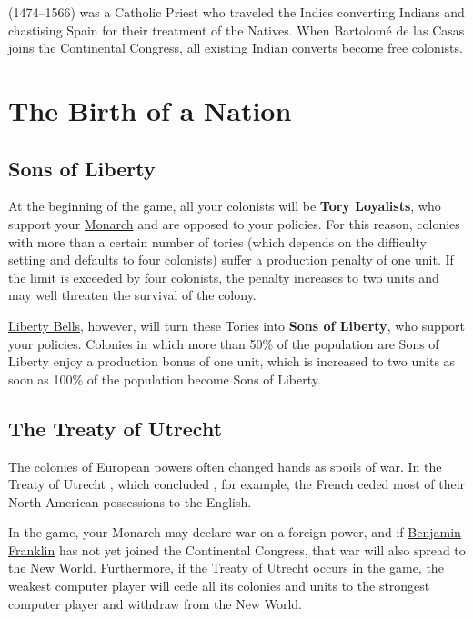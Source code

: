 \documentclass[12pt]{book}
\begin{document}
(1474--1566) was a Catholic Priest who traveled the Indies converting
Indians and chastising Spain for their treatment of the Natives. When
Bartolom\'e de las Casas joins the Continental Congress, all existing
Indian converts become free
colonists. 



\hypertarget{The Birth of a Nation}{\chapter{The Birth of a Nation}}

\hypertarget{Sons of Liberty}{\section{Sons of Liberty}}

At the beginning of the game, all your colonists will be
\hypertarget{Tories}{\textbf{Tory Loyalists}}, who support your
\hyperlink{Monarch}{Monarch} and are opposed to your policies. For
this reason, colonies with more than a certain number of tories (which
depends on the difficulty setting and defaults to four colonists)
suffer a production penalty of one unit. If the limit is exceeded by
four colonists, the penalty increases to two units and may well
threaten the survival of the colony.

\hyperlink{Liberty Bells}{Liberty Bells}, however, will turn these
Tories into \textbf{Sons of Liberty}, who support your
policies. Colonies in which more than 50\% of the population are Sons
of Liberty enjoy a production bonus of one unit, which is increased to
two units as soon as 100\% of the population become Sons of Liberty.


\hypertarget{The Treaty of Utrecht}{\section{The Treaty of Utrecht}}

The colonies of European powers often changed hands as spoils of
war. In the Treaty of Utrecht , which
concluded  , for example, the French ceded most of their
North American possessions to the English.

In the game, your Monarch may declare war on a foreign power, and if
\hyperlink{Benjamin Franklin}{Benjamin Franklin} has not yet joined
the Continental Congress, that war will also spread to the New
World. Furthermore, if the Treaty of Utrecht occurs in the game, the
weakest computer player will cede all its colonies and units to the
strongest computer player and withdraw from the New World.
\end{document}
